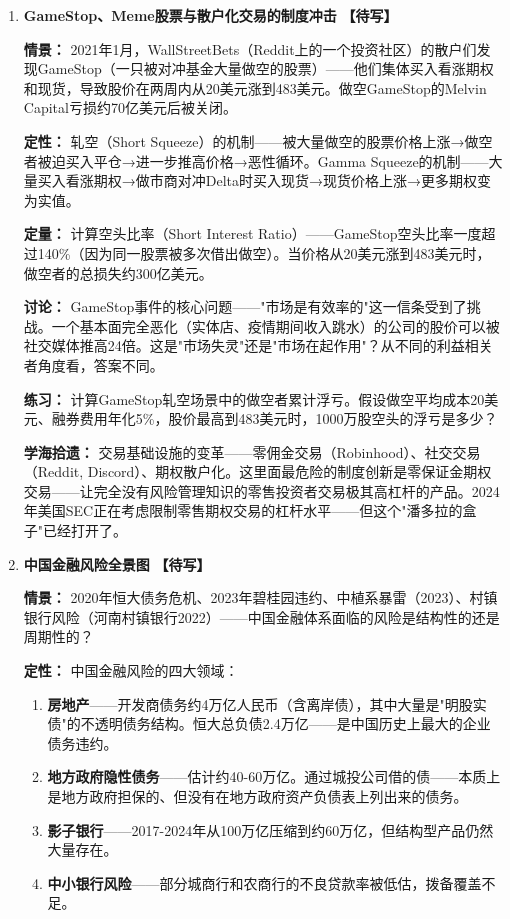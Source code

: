 \documentclass[a4paper,11pt]{ctexart}
\newcommand{\draft}{\textcolor{orange!80!black}{\textbf{【待写】}}}
\begin{document}
\begin{enumerate}
\item[\textbf{第20课}] \textbf{GameStop、Meme股票与散户化交易的制度冲击} \draft

\textbf{情景：} 2021年1月，WallStreetBets（Reddit上的一个投资社区）的散户们发现GameStop（一只被对冲基金大量做空的股票）——他们集体买入看涨期权和现货，导致股价在两周内从20美元涨到483美元。做空GameStop的Melvin Capital亏损约70亿美元后被关闭。

\textbf{定性：} 轧空（Short Squeeze）的机制——被大量做空的股票价格上涨→做空者被迫买入平仓→进一步推高价格→恶性循环。Gamma Squeeze的机制——大量买入看涨期权→做市商对冲Delta时买入现货→现货价格上涨→更多期权变为实值。

\textbf{定量：} 计算空头比率（Short Interest Ratio）——GameStop空头比率一度超过140\%（因为同一股票被多次借出做空）。当价格从20美元涨到483美元时，做空者的总损失约300亿美元。

\textbf{讨论：} GameStop事件的核心问题——"市场是有效率的"这一信条受到了挑战。一个基本面完全恶化（实体店、疫情期间收入跳水）的公司的股价可以被社交媒体推高24倍。这是"市场失灵"还是"市场在起作用"？从不同的利益相关者角度看，答案不同。

\textbf{练习：} 计算GameStop轧空场景中的做空者累计浮亏。假设做空平均成本20美元、融券费用年化5\%，股价最高到483美元时，1000万股空头的浮亏是多少？

\textbf{学海拾遗：} 交易基础设施的变革——零佣金交易（Robinhood）、社交交易（Reddit, Discord）、期权散户化。这里面最危险的制度创新是零保证金期权交易——让完全没有风险管理知识的零售投资者交易极其高杠杆的产品。2024年美国SEC正在考虑限制零售期权交易的杠杆水平——但这个"潘多拉的盒子"已经打开了。

\item[\textbf{第21课}] \textbf{中国金融风险全景图} \draft

\textbf{情景：} 2020年恒大债务危机、2023年碧桂园违约、中植系暴雷（2023）、村镇银行风险（河南村镇银行2022）——中国金融体系面临的风险是结构性的还是周期性的？

\textbf{定性：} 中国金融风险的四大领域：
\begin{enumerate}
  \item \textbf{房地产}——开发商债务约4万亿人民币（含离岸债），其中大量是"明股实债"的不透明债务结构。恒大总负债2.4万亿——是中国历史上最大的企业债务违约。
  \item \textbf{地方政府隐性债务}——估计约40-60万亿。通过城投公司借的债——本质上是地方政府担保的、但没有在地方政府资产负债表上列出来的债务。
  \item \textbf{影子银行}——2017-2024年从100万亿压缩到约60万亿，但结构型产品仍然大量存在。
  \item \textbf{中小银行风险}——部分城商行和农商行的不良贷款率被低估，拨备覆盖不足。
\end{enumerate}


\end{enumerate}
\end{document}
